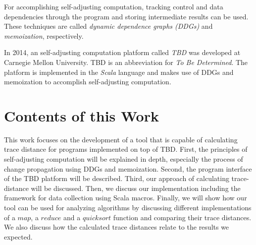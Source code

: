 For accomplishing self-adjusting computation, tracking control and data dependencies through the program and storing intermediate results can be used. These techniques are called \textit{dynamic dependence graphs (DDGs)} and \textit{memoization}, respectively. 

In 2014, an self-adjusting computation platform called \textit{TBD} was developed at Carnegie Mellon University. TBD is an abbreviation for \textit{To Be Determined}. The platform is implemented in the \textit{Scala} language and makes use of DDGs and memoization to accomplish self-adjusting computation. 

\section{Contents of this Work}

This work focuses on the development of a tool that is capable of calculating trace distance for programs implemented on top of TBD. First, the principles of self-adjusting computation will be explained in depth, especially the process of change propagation using DDGs and memoization. Second, the program interface of the TBD platform will be described. Third, our approach of calculating trace-distance will be discussed. Then, we discuss our implementation including the framework for data collection using Scala macros. 
Finally, we will show how our tool can be used for analyzing algorithms by discussing different implementations of a $map$, a $reduce$ and a $quicksort$ function and comparing their trace distances. We also discuss how the calculated trace distances relate to the results we expected.   